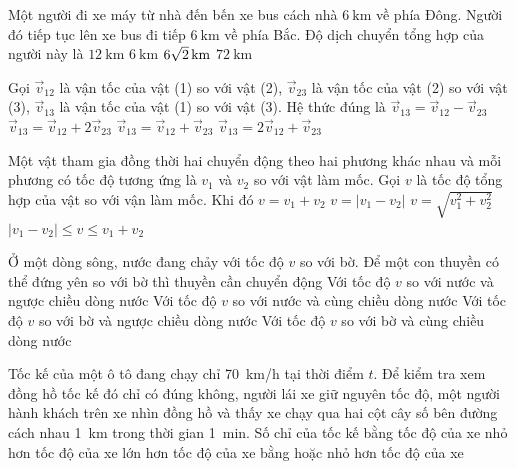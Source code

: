 \begin{ex}
	Một người đi xe máy từ nhà đến bến xe bus cách nhà $\SI{6}{\kilo\meter}$ về phía Đông. Người đó tiếp tục lên xe bus đi tiếp $\SI{6}{\kilo\meter}$ về phía Bắc. Độ dịch chuyển tổng hợp của người này là	
	\choice
	{$\SI{12}{\kilo\meter}$}
	{$\SI{6}{\kilo\meter}$}
	{\True $\xsi{6\sqrt{2}}{\kilo\meter}$}
	{$\SI{72}{\kilo\meter}$}
	\loigiai{}
\end{ex}
\begin{ex}
	Gọi $\vec{v}_{12}$ là vận tốc của vật (1) so với vật (2), $\vec{v}_{23}$ là vận tốc của vật (2) so với vật (3), $\vec{v}_{13}$ là vận tốc của vật (1) so với vật (3). Hệ thức đúng là
	\choice
	{$\vec{v}_{13}=\vec{v}_{12}-\vec{v}_{23}$}
	{$\vec{v}_{13}=\vec{v}_{12}+2\vec{v}_{23}$}
	{\True $\vec{v}_{13}=\vec{v}_{12}+\vec{v}_{23}$}
	{$\vec{v}_{13}=2\vec{v}_{12}+\vec{v}_{23}$}
	\loigiai{}
\end{ex}
\begin{ex}
	Một vật tham gia đồng thời hai chuyển động theo hai phương khác nhau và mỗi phương có tốc độ tương ứng là $v_1$ và $v_2$ so với vật làm mốc. Gọi $v$ là tốc độ tổng hợp của vật so với vận làm mốc. Khi đó
	\choice
	{$v = v_1 + v_2$}
	{$v = |v_1 - v_2|$}
	{$v = \sqrt{v_1^2 + v_2^2}$}
	{\True $|v_1 - v_2| \le v \le v_1 + v_2$}
	\loigiai{}
\end{ex}

\begin{ex}
	Ở một dòng sông, nước đang chảy với tốc độ $v$ so với bờ. Để một con thuyền có thể đứng yên so với bờ thì thuyền cần chuyển động
	\choice
	{\True Với tốc độ $v$ so với nước và ngược chiều dòng nước}
	{Với tốc độ $v$ so với nước và cùng chiều dòng nước}
	{Với tốc độ $v$ so với bờ và ngược chiều dòng nước}
	{Với tốc độ $v$ so với bờ và cùng chiều dòng nước}
	\loigiai{}
\end{ex}

\begin{ex}
	Tốc kế của một ô tô đang chạy chỉ \SI{70}{\kilo\meter/\hour} tại thời điểm $t$. Để kiểm tra xem đồng hồ tốc kế đó chỉ có đúng không, người lái xe giữ nguyên tốc độ, một người hành khách trên xe nhìn đồng hồ và thấy xe chạy qua hai cột cây số bên đường cách nhau \SI{1}{\kilo\meter} trong thời gian \SI{1}{\minute}. Số chỉ của tốc kế
	\choice
	{bằng tốc độ của xe}
	{nhỏ hơn tốc độ của xe}
	{\True lớn hơn tốc độ của xe}
	{bằng hoặc nhỏ hơn tốc độ của xe}
	\loigiai{}
\end{ex}

